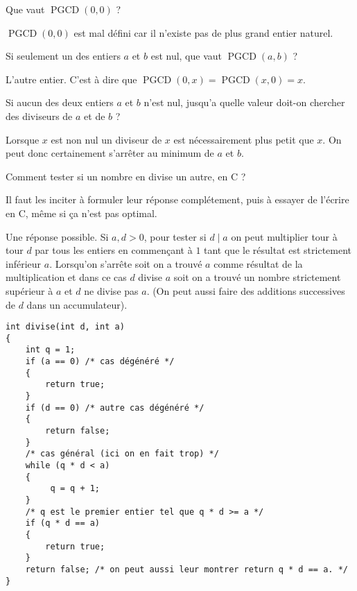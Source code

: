 \begin{newenu}
\item Que vaut $\operatorname{PGCD}(0, 0)$ ?
  \begin{correction}
    $\operatorname{PGCD}(0, 0)$ est mal défini car il n'existe pas de plus grand entier naturel.
  \end{correction}
\item Si seulement un des entiers $a$ et $b$ est nul, que vaut $\operatorname{PGCD}(a, b)$ ?
  \begin{correction}
    L'autre entier. C'est à dire que  $\operatorname{PGCD}(0, x) =  \operatorname{PGCD}(x, 0) = x$.
  \end{correction}
\item Si aucun des deux entiers $a$ et $b$ n'est nul, jusqu'a quelle valeur doit-on chercher des diviseurs de $a$ et de $b$ ?

  \begin{correction}
    Lorsque $x$ est non nul un diviseur de $x$ est nécessairement plus petit que $x$.  On peut donc certainement s'arrêter au minimum de $a$ et $b$.
  \end{correction}
\item Comment tester si un nombre en divise un autre, en C ?
  \begin{correction}
Il faut les inciter à formuler leur réponse complétement, puis à essayer de l'écrire en C, même si ça n'est pas optimal.

Une réponse possible.
    Si $a, d > 0$, pour tester si $d \mid a$ on peut multiplier tour à tour $d$ par tous les entiers en commençant à $1$ tant que le résultat est strictement inférieur $a$. Lorsqu'on s'arrête soit on a trouvé $a$ comme résultat de la multiplication et dans ce cas $d$ divise $a$ soit on a trouvé un nombre strictement supérieur à $a$ et $d$ ne divise pas $a$. (On peut aussi faire des additions successives de $d$ dans un accumulateur).

\begin{verbatim}
int divise(int d, int a)
{
    int q = 1;
    if (a == 0) /* cas dégénéré */
    {
        return true;
    }
    if (d == 0) /* autre cas dégénéré */
    {
        return false;
    }
    /* cas général (ici on en fait trop) */
    while (q * d < a)
    {
         q = q + 1;
    }
    /* q est le premier entier tel que q * d >= a */
    if (q * d == a)
    {
        return true;
    }
    return false; /* on peut aussi leur montrer return q * d == a. */
}
\end{verbatim}


\end{correction}
\end{newenu}
